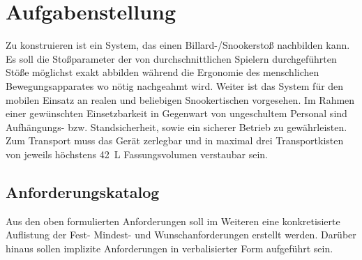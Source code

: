 \chapter{Aufgabenstellung}\label{chap:Aufgabenstellung}

	Zu konstruieren ist ein System, das einen Billard-/Snookerstoß nachbilden kann.
	Es soll die Stoßparameter der von durchschnittlichen Spielern durchgeführten Stöße möglichst exakt abbilden während die Ergonomie des menschlichen Bewegungsapparates wo nötig nachgeahmt wird.
	Weiter ist das System für den mobilen Einsatz an realen und beliebigen Snookertischen vorgesehen. Im Rahmen einer gewünschten Einsetzbarkeit in Gegenwart von ungeschultem Personal sind Aufhängungs- bzw. Standsicherheit, sowie ein sicherer Betrieb zu gewährleisten.
	Zum Transport muss das Gerät zerlegbar und in maximal drei Transportkisten von jeweils höchstens \SI{42}{L} Fassungsvolumen verstaubar sein.

	\section{Anforderungskatalog}
		Aus den oben formulierten Anforderungen soll im Weiteren eine konkretisierte Auflistung der Fest- Mindest- und Wunschanforderungen erstellt werden.
		Darüber hinaus sollen implizite Anforderungen in verbalisierter Form aufgeführt sein.\par\medskip

